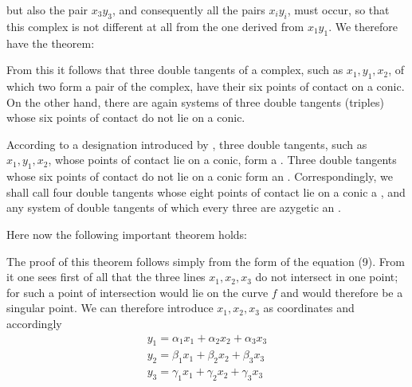 but also the pair $x_3 y_3$, and consequently all the pairs $x_i y_i$, must occur, so that this complex is not different at all from the one derived from $x_1 y_1$. We therefore have the theorem:


From this it follows that three double tangents of a  complex, such as $x_1, y_1, x_2$, of which two form a pair of the complex, have their six points of contact on a conic. On the other hand, there are again systems of three double tangents (triples) whose six points of contact do not lie on a conic.

According to a designation introduced by , three double tangents, such as $x_1, y_1, x_2$, whose points of contact lie on a conic, form a . Three double tangents whose six points of contact do not lie on a conic form an . Correspondingly, we shall call four double tangents whose eight points of contact lie on a conic a , and any system of double tangents of which every three are azygetic an .

Here now the following important theorem holds:


The proof of this theorem follows simply from the form of the equation (9). From it one sees first of all that the three lines $x_1, x_2, x_3$ do not intersect in one point; for such a point of intersection would lie on the curve $f$ and would therefore be a singular point. We can therefore introduce $x_1, x_2, x_3$ as coordinates and accordingly
\[
\begin{gathered}
y_1 = \alpha_1 x_1 + \alpha_2 x_2 + \alpha_3 x_3\\
y_2 = \beta_1 x_1 + \beta_2 x_2 + \beta_3 x_3\\
y_3 = \gamma_1 x_1 + \gamma_2 x_2 + \gamma_3 x_3
\end{gathered}
\]
